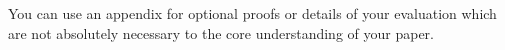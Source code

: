 \documentclass{vldb}
\begin{document}




\balance
\begin{appendix}
You can use an appendix for optional proofs or details of your evaluation which are not absolutely necessary to the core understanding of your paper.




\end{appendix}
\end{document}
